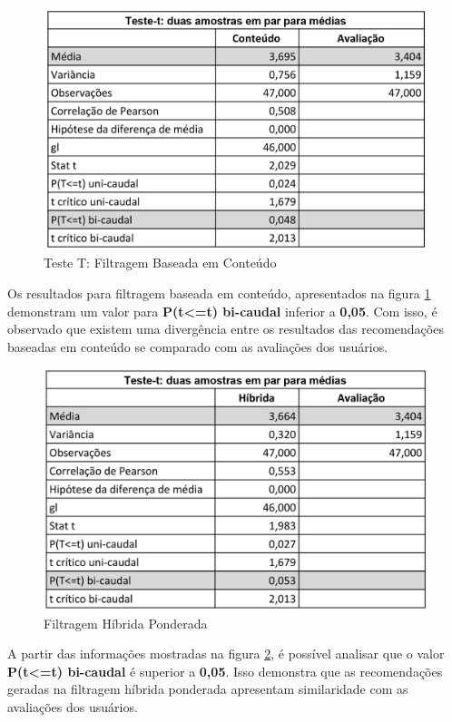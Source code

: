 \begin{figure}[H]
	\centering
	\includegraphics[width=.7\linewidth]{imagens/testeTConteudo.jpg}
	\caption[Teste T: Filtragem Baseada em Conteúdo]{Teste T: Filtragem Baseada em Conteúdo}
    \label{fig:testeTConteudo}
\end{figure}

Os resultados para filtragem baseada em conteúdo, apresentados na figura \ref{fig:testeTConteudo} demonstram um valor para \textbf{P(t<=t) bi-caudal} inferior a \textbf{0,05}. Com isso, é observado que existem uma divergência entre os resultados das recomendações baseadas em conteúdo se comparado com as avaliações dos usuários.

\begin{figure}[H]
	\centering
	\includegraphics[width=.7\linewidth]{imagens/testeTPonderada.jpg}
	\caption[Teste T: Filtragem Híbrida Ponderada]{Filtragem Híbrida Ponderada}
    \label{fig:testeTPonderado}
\end{figure}

A partir das informações mostradas na figura \ref{fig:testeTPonderado}, é possível analisar que o valor \textbf{P(t<=t) bi-caudal} é superior a \textbf{0,05}. Isso demonstra que as recomendações geradas na filtragem híbrida ponderada apresentam similaridade com as avaliações dos usuários.

